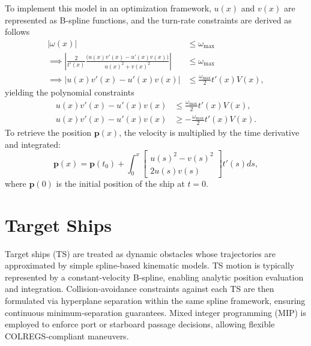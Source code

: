 To implement this model in an optimization framework, $u(x)$ and $v(x)$ are represented as B-spline functions, and the turn-rate constraints are derived as follows
\begin{equation}
    \begin{aligned}
        |\omega(x)| &\le \omega_{\max} \\
        \implies \left|\frac{2}{t'(x)}\frac{\big(u(x)v'(x) - u'(x)v(x)\big)}{u(x)^2 + v(x)^2}\right| &\le \omega_{\max} \\
        \implies \left|u(x)v'(x) - u'(x)v(x)\right| &\le \frac{\omega_{\max}}{2}t'(x)V(x),
    \end{aligned}
\end{equation}
yielding the polynomial constraints
\begin{subequations}\label{eq:dubins-ph-turn-rate}
    \begin{align}
        u(x)v'(x) - u'(x)v(x) &\le \frac{\omega_{\max}}{2}t'(x)V(x), \\
        u(x)v'(x) - u'(x)v(x) &\ge -\frac{\omega_{\max}}{2}t'(x)V(x).
    \end{align}
\end{subequations}
To retrieve the position $\mathbf{p}(x)$, the velocity is multiplied by the time derivative and integrated:
\begin{equation}\label{eq:dubins-ph-position}
    \mathbf{p}(x) = \mathbf p(t_0) 
    + \int_0^x \begin{bmatrix} 
        u(s)^2-v(s)^2 \\ 2 u(s)v(s)
    \end{bmatrix} t'(s) ds,
\end{equation}
where $\mathbf p(0)$ is the initial position of the ship at $t=0$.

\section{Target Ships}
Target ships (TS) are treated as dynamic obstacles whose trajectories are approximated by simple spline‐based kinematic models. TS motion is typically represented by a constant‐velocity B‐spline, enabling analytic position evaluation and integration. Collision‐avoidance constraints against each TS are then formulated via hyperplane separation within the same spline framework, ensuring continuous minimum‐separation guarantees. Mixed integer programming (MIP) is employed to enforce port or starboard passage decisions, allowing flexible COLREGS‐compliant maneuvers.

